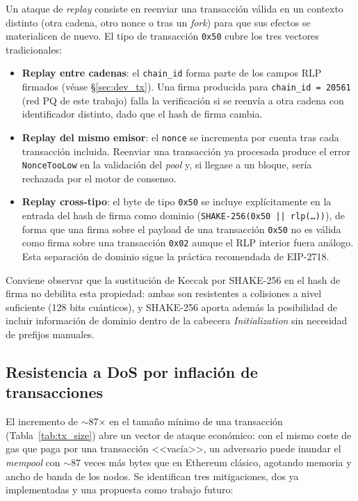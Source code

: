 Un ataque de \emph{replay} consiste en reenviar una transacción válida en un contexto distinto (otra cadena, otro nonce o tras un \emph{fork}) para que sus efectos se materialicen de nuevo. El tipo de transacción \texttt{0x50} cubre los tres vectores tradicionales:

\begin{itemize}
  \item \textbf{Replay entre cadenas}: el \texttt{chain\_id} forma parte de los campos RLP firmados (véase \S\ref{sec:dev_tx}). Una firma producida para \texttt{chain\_id = 20561} (red PQ de este trabajo) falla la verificación si se reenvía a otra cadena con identificador distinto, dado que el hash de firma cambia.
  
  \item \textbf{Replay del mismo emisor}: el \texttt{nonce} se incrementa por cuenta tras cada transacción incluida. Reenviar una transacción ya procesada produce el error \texttt{NonceTooLow} en la validación del \emph{pool} y, si llegase a un bloque, sería rechazada por el motor de consenso.
  
  \item \textbf{Replay cross-tipo}: el byte de tipo \texttt{0x50} se incluye explícitamente en la entrada del hash de firma como dominio (\texttt{SHAKE-256(0x50 || rlp(\ldots))}), de forma que una firma sobre el payload de una transacción \texttt{0x50} no es válida como firma sobre una transacción \texttt{0x02} aunque el RLP interior fuera análogo. Esta separación de dominio sigue la práctica recomendada de EIP-2718.
\end{itemize}

Conviene observar que la sustitución de Keccak por SHAKE-256 en el hash de firma no debilita esta propiedad: ambas son resistentes a colisiones a nivel suficiente (128 bits cuánticos), y SHAKE-256 aporta además la posibilidad de incluir información de dominio dentro de la cabecera \emph{Initialization} sin necesidad de prefijos manuales.

\subsection{Resistencia a DoS por inflación de transacciones}
\label{sec:sec_dos}

El incremento de $\sim$87$\times$ en el tamaño mínimo de una transacción (Tabla~\ref{tab:tx_size}) abre un vector de ataque económico: con el mismo coste de gas que paga por una transacción <<vacía>>, un adversario puede inundar el \emph{mempool} con $\sim$87 veces más bytes que en Ethereum clásico, agotando memoria y ancho de banda de los nodos. Se identifican tres mitigaciones, dos ya implementadas y una propuesta como trabajo futuro:

